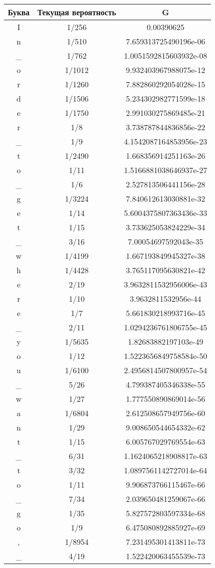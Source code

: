 \begin{center}
    \begin{longtable}{|c|c|c|}
        \hline
        Буква&Текущая вероятность&G \\
         \hline  I&1/256&0.00390625\\ \hline  n&1/510&7.659313725490196e-06\\ \hline  \_&1/762&1.0051592815603932e-08\\ \hline  o&1/1012&9.932403967988075e-12\\ \hline  r&1/1260&7.882860292054028e-15\\ \hline  d&1/1506&5.234302982771599e-18\\ \hline  e&1/1750&2.991030275869485e-21\\ \hline  r&1/8&3.738787844836856e-22\\ \hline  \_&1/9&4.1542087164853956e-23\\ \hline  t&1/2490&1.668356914251163e-26\\ \hline  o&1/11&1.5166881038646937e-27\\ \hline  \_&1/6&2.527813506441156e-28\\ \hline  g&1/3224&7.840612613030881e-32\\ \hline  e&1/14&5.6004375807363436e-33\\ \hline  t&1/15&3.733625053824229e-34\\ \hline  \_&3/16&7.00054697592043e-35\\ \hline  w&1/4199&1.667193849945327e-38\\ \hline  h&1/4428&3.765117095630821e-42\\ \hline  e&2/19&3.9632811532956006e-43\\ \hline  r&1/10&3.9632811532956e-44\\ \hline  e&1/7&5.661830218993716e-45\\ \hline  \_&2/11&1.0294236761806755e-45\\ \hline  y&1/5635&1.82683882197103e-49\\ \hline  o&1/12&1.5223656849758584e-50\\ \hline  u&1/6100&2.4956814507800957e-54\\ \hline  \_&5/26&4.799387405346338e-55\\ \hline  w&1/27&1.777550890869014e-56\\ \hline  a&1/6804&2.612508657949756e-60\\ \hline  n&1/29&9.008650544654332e-62\\ \hline  t&1/15&6.005767029769554e-63\\ \hline  \_&6/31&1.1624065218908817e-63\\ \hline  t&3/32&1.0897561142727014e-64\\ \hline  o&1/11&9.906873766115467e-66\\ \hline  \_&7/34&2.039650481259067e-66\\ \hline  g&1/35&5.827572803597334e-68\\ \hline  o&1/9&6.475080892885927e-69\\ \hline  ,&1/8954&7.231495301413811e-73\\ \hline  \_&4/19&1.522420063455539e-73\\ \hline  
\end{longtable}
\end{center}
